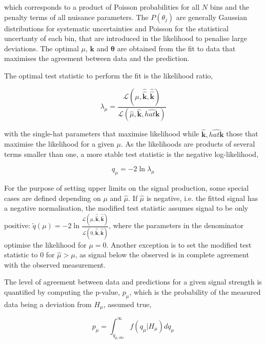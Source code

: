 which corresponds to a product of Poisson probabilities for all $N$ bins and the penalty terms of all nuisance parameters. The $P(\theta_j)$ are generally Gaussian distributions for systematic uncertainties and Poisson for the statistical uncertanty of each bin, that are introduced in the likelihood to penalise large deviations.
The optimal $\mu$, $\mathbf{k}$ and $\boldsymbol{\theta}$ are obtained from the fit to data that maximises the agreement between data and the prediction.

The optimal test statistic to perform the fit is the likelihood ratio, %

\begin{equation}
    \lambda_\mu = \frac{\mathscr{L}(\mu, \hat{\hat{\mathbf{k}}},\hat{\hat{\mathbf{k}}})}{\mathscr{L}(\hat{\mu}, \hat{\mathbf{k}},\hat{hat{\mathbf{k}}})}
\end{equation}

with the single-hat parameters that maximise likelihood while $\hat{\mathbf{k}},\hat{hat{\mathbf{k}}}$ those that maximise the likelihood for a given $\mu$. As the likelihoods are products of several terms smaller than one, a more stable test statistic is the negative log-likelihood,

\begin{equation}
    q_\mu = -2\ln\lambda_\mu
\end{equation}

For the purpose of setting upper limits on the signal production, some special cases are defined depending on $\mu$ and $\hat{\mu}$. If $\hat{\mu}$ is negative, i.e. the fitted signal has a negative normalisation, the modified test statistic assumes signal to be only positive: $\tilde{q}(\mu)=-2\ln\frac{\mathscr{L}(\mu, \hat{\hat{\mathbf{k}}},\hat{\hat{\mathbf{k}}})}{\mathscr{L}(0, \hat{\hat{\mathbf{k}}},\hat{\hat{\mathbf{k}}})}$, where the parameters in the denominator optimise the likelihood for $\mu=0$. Another exception is to set the modified test statistic to 0 for $\hat{\mu}>\mu$, as signal below the observed is in complete agreement with the observed measurement.

The level of agreement between data and predictions for a given signal strength is quantified by computing the p-value, $p_\mu$, which is the probability of the measured data being a deviation from $H_\mu$, assumed true,

\begin{equation}
    p_\mu = \int_{q_{\mu,obs}}^\infty f(q_\mu|H_\mu)dq_\mu
\end{equation}

